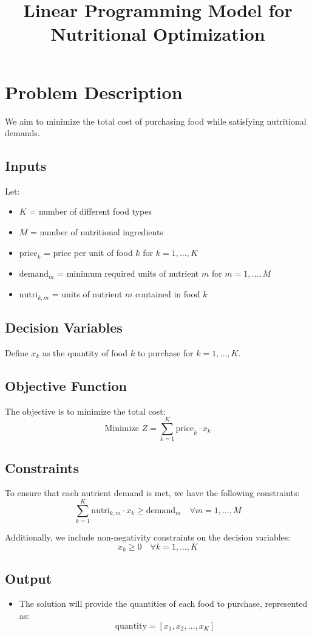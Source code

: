 \documentclass{article}
\begin{document}
\title{Linear Programming Model for Nutritional Optimization}
\author{}
\date{}
\maketitle

\section*{Problem Description}
We aim to minimize the total cost of purchasing food while satisfying nutritional demands.

\subsection*{Inputs}
Let:
\begin{itemize}
    \item $K$ = number of different food types
    \item $M$ = number of nutritional ingredients
    \item $\text{price}_k$ = price per unit of food $k$ for $k = 1, \ldots, K$
    \item $\text{demand}_m$ = minimum required units of nutrient $m$ for $m = 1, \ldots, M$
    \item $\text{nutri}_{k,m}$ = units of nutrient $m$ contained in food $k$
\end{itemize}

\subsection*{Decision Variables}
Define $x_k$ as the quantity of food $k$ to purchase for $k = 1, \ldots, K$.

\subsection*{Objective Function}
The objective is to minimize the total cost:
\[
\text{Minimize } Z = \sum_{k=1}^{K} \text{price}_k \cdot x_k
\]

\subsection*{Constraints}
To ensure that each nutrient demand is met, we have the following constraints:
\[
\sum_{k=1}^{K} \text{nutri}_{k,m} \cdot x_k \geq \text{demand}_m \quad \forall m = 1, \ldots, M
\]

Additionally, we include non-negativity constraints on the decision variables:
\[
x_k \geq 0 \quad \forall k = 1, \ldots, K
\]

\subsection*{Output}
\begin{itemize}
    \item The solution will provide the quantities of each food to purchase, represented as:
    \[
    \text{quantity} = [x_1, x_2, \ldots, x_K]
    \]
\end{itemize}
\end{document}

